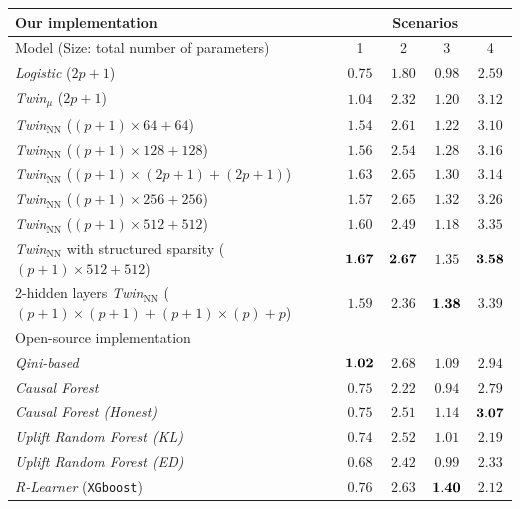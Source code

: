 \documentclass{article}
\begin{document}
\begin{table}[!ht]
    \centering
    \begin{tabular}{l|cccc}
        \hline
        Our implementation & \multicolumn{4}{c}{Scenarios}\\
        \hline
        Model (Size: total number of parameters) & 1 & 2 & 3 & 4  \\
        \hline
        {\it Logistic} ($2p+1$) & $0.75$ & $1.80$   & $0.98$ & $2.59$\\
        {\it Twin$_{\mu}$} ($2p+1$) & $1.04$  & $2.32$ & $1.20$ & $3.12$\\
        {\it Twin$_{\mathrm{NN}}$} ($(p+1)\times 64 + 64$)  & $1.54$  & $2.61$  & $1.22$ & $3.10$ \\
        {\it Twin$_{\mathrm{NN}}$} ($(p+1)\times 128 + 128$) & $1.56$  & $2.54$  & $1.28$ & $3.16$\\
        {\it Twin$_{\mathrm{NN}}$} ($(p+1)\times (2p+1) + (2p+1)$) & $ 1.63$ & $2.65$  & $1.30$ & $3.14$\\
        {\it Twin$_{\mathrm{NN}}$} ($(p+1)\times 256 + 256$) & $1.57$ & $2.65$  & $ 1.32$ & $3.26$ \\
        {\it Twin$_{\mathrm{NN}}$} ($(p+1)\times 512 + 512$) & $1.60$ & $2.49$  & $1.18$ & $ 3.35$\\
        {\it Twin$_{\mathrm{NN}}$} with structured sparsity ($(p+1)\times 512 + 512$) & $\bf 1.67$  & $\bf 2.67$ & $1.35$ & $\bf 3.58$\\
        2-hidden layers {\it Twin$_{\mathrm{NN}}$} ($(p+1)\times(p+1) + (p+1)\times(p) + p $) & $1.59$ & $2.36$  & $\bf 1.38$ & $3.39$ \\
        \hline
        \multicolumn{5}{l}{Open-source implementation}\\
        \hline
        {\it Qini-based} \citep{belba2019qbased} & $\bf 1.02$ & $2.68$  & $1.09$ & $2.94$\\
        {\it Causal Forest} \citep{athey2019generalized} & $0.75$ & $2.22$  & $0.94$ & $2.79$ \\
        {\it Causal Forest (Honest)} \citep{athey2019generalized} & $0.75$  & $2.51$  & $1.14$ & $\bf 3.07$\\
        {\it Uplift Random Forest (KL)} \citep{guelman2012random} & $0.74$ & $2.52$  & $1.01$& $2.19$ \\
        {\it Uplift Random Forest (ED)} \citep{guelman2012random} & $0.68$ & $2.42$ & $0.99$ & $2.33$ \\
        {\it R-Learner }(\texttt{XGboost}) \citep{NieWager2020Quasi} & $0.76$ & $2.63$ & $\bf 1.40$ & $2.12$\\

\end{tabular}
\end{table}
\end{document}
